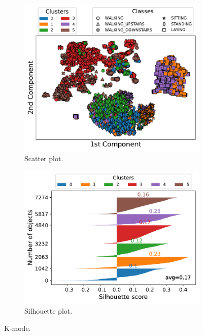 \documentclass[10pt, a4paper, twocolumn]{article}
\begin{document}
\begin{figure}
\centering
\begin{subfigure}[t]{0.49\columnwidth}
    \includegraphics[width=\linewidth]{immagini simone/kmode_scatter.pdf}
    \caption{Scatter plot.}
    \label{fig:kmode_scatter}
\end{subfigure}
\begin{subfigure}[t]{0.5\columnwidth}
    \includegraphics[width=\linewidth]{immagini simone/kmode_silh.pdf}
    \caption{Silhouette plot.}
    \label{fig:kmode_silh}
\end{subfigure}
\caption{K-mode.}
\label{fig:kmode}
\end{figure}
\end{document}
